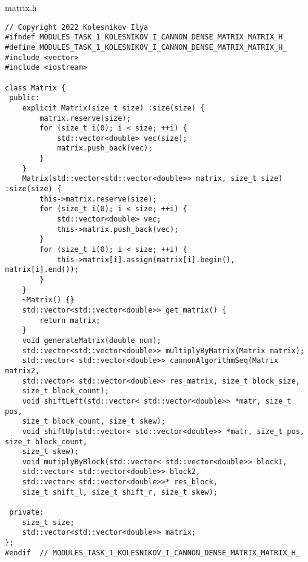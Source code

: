 \documentclass{report}
\begin{document}
matrix.h
\begin{lstlisting}
// Copyright 2022 Kolesnikov Ilya
#ifndef MODULES_TASK_1_KOLESNIKOV_I_CANNON_DENSE_MATRIX_MATRIX_H_
#define MODULES_TASK_1_KOLESNIKOV_I_CANNON_DENSE_MATRIX_MATRIX_H_
#include <vector>
#include <iostream>

class Matrix {
 public:
    explicit Matrix(size_t size) :size(size) {
        matrix.reserve(size);
        for (size_t i(0); i < size; ++i) {
            std::vector<double> vec(size);
            matrix.push_back(vec);
        }
    }
    Matrix(std::vector<std::vector<double>> matrix, size_t size) :size(size) {
        this->matrix.reserve(size);
        for (size_t i(0); i < size; ++i) {
            std::vector<double> vec;
            this->matrix.push_back(vec);
        }
        for (size_t i(0); i < size; ++i) {
            this->matrix[i].assign(matrix[i].begin(), matrix[i].end());
        }
    }
    ~Matrix() {}
    std::vector<std::vector<double>> get_matrix() {
        return matrix;
    }
    void generateMatrix(double num);
    std::vector<std::vector<double>> multiplyByMatrix(Matrix matrix);
    std::vector< std::vector<double>> cannonAlgorithmSeq(Matrix matrix2,
    std::vector< std::vector<double>> res_matrix, size_t block_size,
    size_t block_count);
    void shiftLeft(std::vector< std::vector<double>> *matr, size_t pos,
    size_t block_count, size_t skew);
    void shiftUp(std::vector< std::vector<double>> *matr, size_t pos, size_t block_count,
    size_t skew);
    void mutiplyByBlock(std::vector< std::vector<double>> block1,
    std::vector< std::vector<double>> block2,
    std::vector< std::vector<double>>* res_block,
    size_t shift_l, size_t shift_r, size_t skew);

 private:
    size_t size;
    std::vector<std::vector<double>> matrix;
};
#endif  // MODULES_TASK_1_KOLESNIKOV_I_CANNON_DENSE_MATRIX_MATRIX_H_
\end{lstlisting}
\end{document}
